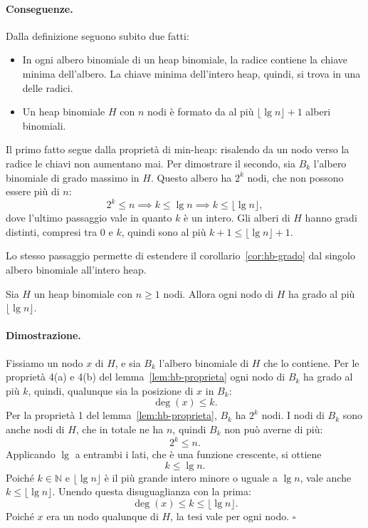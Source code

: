 \paragraph{Conseguenze.}
Dalla definizione seguono subito due fatti:
\begin{itemize}
    \item In ogni albero binomiale di un heap binomiale, la radice contiene la chiave minima dell'albero. La chiave minima dell'intero heap, quindi, si trova in una delle radici.
    \item Un heap binomiale $H$ con $n$ nodi è formato da al più $\lfloor \lg n \rfloor + 1$ alberi binomiali.
\end{itemize}
Il primo fatto segue dalla proprietà di min-heap: risalendo da un nodo verso la radice le chiavi non aumentano mai. Per dimostrare il secondo, sia $B_k$ l'albero binomiale di grado massimo in $H$. Questo albero ha $2^k$ nodi, che non possono essere più di $n$:
\[
2^k \le n \implies k \le \lg n \implies k \le \lfloor \lg n \rfloor,
\]
dove l'ultimo passaggio vale in quanto $k$ è un intero. Gli alberi di $H$ hanno gradi distinti, compresi tra $0$ e $k$, quindi sono al più $k + 1 \le \lfloor \lg n \rfloor + 1$.

Lo stesso passaggio permette di estendere il corollario~\ref{cor:hb-grado} dal singolo albero binomiale all'intero heap.

\begin{corollario}\label{cor:hb-grado-heap}
Sia $H$ un heap binomiale con $n \ge 1$ nodi. Allora ogni nodo di $H$ ha grado al più $\lfloor \lg n \rfloor$.
\end{corollario}

\paragraph{Dimostrazione.}
Fissiamo un nodo $x$ di $H$, e sia $B_k$ l'albero binomiale di $H$ che lo contiene. Per le proprietà 4(a) e 4(b) del lemma~\ref{lem:hb-proprieta} ogni nodo di $B_k$ ha grado al più $k$, quindi, qualunque sia la posizione di $x$ in $B_k$:
\[
\deg(x) \le k.
\]
Per la proprietà 1 del lemma~\ref{lem:hb-proprieta}, $B_k$ ha $2^k$ nodi. I nodi di $B_k$ sono anche nodi di $H$, che in totale ne ha $n$, quindi $B_k$ non può averne di più:
\[
2^k \le n.
\]
Applicando $\lg$ a entrambi i lati, che è una funzione crescente, si ottiene
\[
k \le \lg n.
\]
Poiché $k \in \mathbb{N}$ e $\lfloor \lg n \rfloor$ è il più grande intero minore o uguale a $\lg n$, vale anche $k \le \lfloor \lg n \rfloor$. Unendo questa disuguaglianza con la prima:
\[
\deg(x) \le k \le \lfloor \lg n \rfloor.
\]
Poiché $x$ era un nodo qualunque di $H$, la tesi vale per ogni nodo. \hfill $\square$

